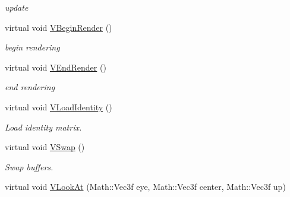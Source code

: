 \begin{DoxyCompactItemize}
\begin{DoxyCompactList}\small\item\em update \item\end{DoxyCompactList}\item 
\hypertarget{classPlatform_1_1Renderer_1_1GL_1_1Renderer_a1c7fd7840033da0fe8c59becbaf3d807}{
virtual void \hyperlink{classPlatform_1_1Renderer_1_1GL_1_1Renderer_a1c7fd7840033da0fe8c59becbaf3d807}{VBeginRender} ()}
\label{classPlatform_1_1Renderer_1_1GL_1_1Renderer_a1c7fd7840033da0fe8c59becbaf3d807}

\begin{DoxyCompactList}\small\item\em begin rendering \item\end{DoxyCompactList}\item 
\hypertarget{classPlatform_1_1Renderer_1_1GL_1_1Renderer_ad2c659826568bfbfe41ff5e883fd71ea}{
virtual void \hyperlink{classPlatform_1_1Renderer_1_1GL_1_1Renderer_ad2c659826568bfbfe41ff5e883fd71ea}{VEndRender} ()}
\label{classPlatform_1_1Renderer_1_1GL_1_1Renderer_ad2c659826568bfbfe41ff5e883fd71ea}

\begin{DoxyCompactList}\small\item\em end rendering \item\end{DoxyCompactList}\item 
\hypertarget{classPlatform_1_1Renderer_1_1GL_1_1Renderer_a7b1864c98d1b9a44a43a096c51f91834}{
virtual void \hyperlink{classPlatform_1_1Renderer_1_1GL_1_1Renderer_a7b1864c98d1b9a44a43a096c51f91834}{VLoadIdentity} ()}
\label{classPlatform_1_1Renderer_1_1GL_1_1Renderer_a7b1864c98d1b9a44a43a096c51f91834}

\begin{DoxyCompactList}\small\item\em Load identity matrix. \item\end{DoxyCompactList}\item 
\hypertarget{classPlatform_1_1Renderer_1_1GL_1_1Renderer_a21bd824e1dd287a6e1b28245503024e2}{
virtual void \hyperlink{classPlatform_1_1Renderer_1_1GL_1_1Renderer_a21bd824e1dd287a6e1b28245503024e2}{VSwap} ()}
\label{classPlatform_1_1Renderer_1_1GL_1_1Renderer_a21bd824e1dd287a6e1b28245503024e2}

\begin{DoxyCompactList}\small\item\em Swap buffers. \item\end{DoxyCompactList}\item 
\hypertarget{classPlatform_1_1Renderer_1_1GL_1_1Renderer_a978f9f8ccebe4a07e9dd57c35d1febe3}{
virtual void \hyperlink{classPlatform_1_1Renderer_1_1GL_1_1Renderer_a978f9f8ccebe4a07e9dd57c35d1febe3}{VLookAt} (Math::Vec3f eye, Math::Vec3f center, Math::Vec3f up)}
\label{classPlatform_1_1Renderer_1_1GL_1_1Renderer_a978f9f8ccebe4a07e9dd57c35d1febe3}


\end{DoxyCompactItemize}
